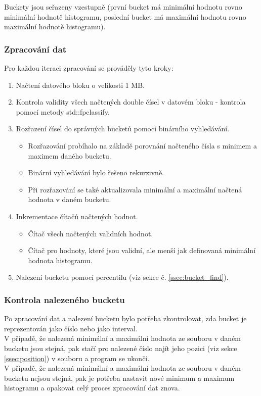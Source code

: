 \documentclass[12pt, a4paper]{article}
\begin{document}
Buckety jsou seřazeny vzestupně (první bucket má minimální hodnotu rovno minimální hodnotě histogramu, poslední bucket má maximální hodnotu rovno maximální hodnotě histogramu).

\subsubsection{Zpracování dat} \label{sssec:old_zpracovani}
Pro každou iteraci zpracování se prováděly tyto kroky:
\begin{enumerate}
\item Načtení datového bloku o velikosti 1 MB.
\item Kontrola validity všech načtených double čísel v datovém bloku - kontrola pomocí metody std::fpclassify.
\item Rozřazení čísel do správných bucketů pomocí binárního vyhledávání.
\begin{itemize}
\item Rozřazování probíhalo na základě porovnání načteného čísla s minimem a maximem daného bucketu.
\item Binární vyhledávání bylo řešeno rekurzivně.
\item Při rozřazování se také aktualizovala minimální a maximální načtená hodnota v daném bucketu.
\end{itemize}
\item Inkrementace čítačů načtených hodnot.
\begin{itemize}
\item Čítač všech načtených validních hodnot.
\item Čítač pro hodnoty, které jsou validní, ale menší jak definovaná minimální hodnota histogramu.
\end{itemize}
\item Nalezení bucketu pomocí percentilu (viz sekce č. \ref{ssec:bucket_find}).
\end{enumerate}

\subsubsection{Kontrola nalezeného bucketu}
Po zpracování dat a nalezení bucketu bylo potřeba zkontrolovat, zda bucket je reprezentován jako číslo nebo jako interval. \\
\indent V případě, že nalezená minimální a maximální hodnota ze souboru v daném bucketu jsou stejná, pak stačí pro nalezené číslo najít jeho pozici (viz sekce \ref{ssec:position}) v souboru a program se ukončí. \\
\indent V případě, že nalezená minimální a maximální hodnota ze souboru v daném bucketu nejsou stejná, pak je potřeba nastavit nové minimum a maximum histogramu a opakovat celý proces zpracování dat znova.
\end{document}
